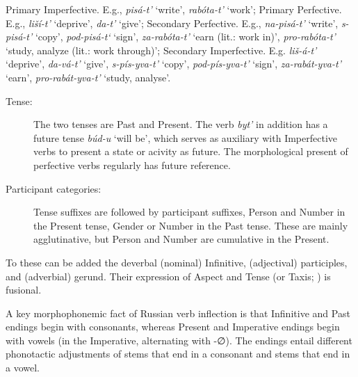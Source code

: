 \documentclass[output=paper, colorlinks,citecolor=brown]{langsci/langscibook}
\begin{document}
\ea \label{ex:andersen_9}
    \ea \label{ex:andersen_9a} Primary Imperfective. E.g., \textit{pisá-t'} `write', \textit{rabóta-t'} ‘work';
    \ex \label{ex:andersen_9b} Primary Perfective. E.g., \textit{liší-t'} ‘deprive', \textit{da-t'} ‘give';
    \ex \label{ex:andersen_9c} Secondary Perfective. E.g., \textit{na-pisá-t'} ‘write', \textit{s-pisá-t'} ‘copy', \textit{pod-pisá-t`} ‘sign', \textit{za-rabóta-t'} ‘earn (lit.: work in)', \textit{pro-rabóta-t'} ‘study, analyze (lit.: work through)';
    \ex \label{ex:andersen_9d} Secondary Imperfective. E.g. \textit{liš-á-t'} ‘deprive', \textit{da-vá-t'} `give', \textit{s-pís-yva-t'} ‘copy', \textit{pod-pís-yva-t'} ‘sign', \textit{za-rabát-yva-t'} ‘earn', \textit{pro-rabát-yva-t'} ‘study, analyse'.
    \z
    \z

\begin{description}
\item[Tense:] The two tenses are Past and Present. The verb \textit{byt'} in addition has a future tense \textit{búd-u} ‘will be', which serves as auxiliary with Imperfective verbs to present a state or acivity as future. The morphological present of perfective verbs regularly has future reference.

\item[Participant categories:] Tense suffixes are followed by participant suffixes, Person and Number in the Present tense, Gender or Number in the Past tense. These are mainly agglutinative, but Person and Number are cumulative in the Present. 
\end{description}

To these can be added the deverbal (nominal) Infinitive, (adjectival) participles, and (adverbial) gerund. Their expression of Aspect and Tense (or Taxis; \citealt{Jakobson1956b}) is fusional.

A key morphophonemic fact of Russian verb inflection is that Infinitive and Past endings begin with consonants, whereas Present and Imperative endings begin with vowels (in the Imperative, alternating with -∅). The endings entail different phonotactic adjustments of stems that end in a consonant and stems that end in a vowel. 
\end{document}
